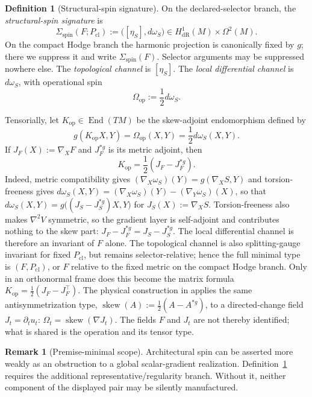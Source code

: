 \documentclass[11pt]{article}
\theoremstyle{definition}
\newtheorem{definition}[theorem]{Definition}
\newtheorem{remark}[theorem]{Remark}
\newcommand{\dR}{\mathrm{dR}}
\newcommand{\Omop}{\Omega_{\mathrm{op}}}
\newcommand{\Sigspin}{\Sigma_{\mathrm{spin}}}
\DeclareMathOperator{\opskew}{skew}
\begin{document}
\begin{definition}[Structural-spin signature]\label{def:signature}
On the declared-selector branch, the \emph{structural-spin signature} is
\[
\Sigspin(F;P_{\mathrm{cl}})
  :=\bigl([\eta_S],d\omega_S\bigr)
  \in H^1_{\dR}(M)\times\Omega^2(M).
\]
On the compact Hodge branch the harmonic projection is canonically fixed by
\(g\); there we suppress it and write \(\Sigspin(F)\).  Selector arguments
may be suppressed nowhere else.  The \emph{topological channel} is
\([\eta_S]\).  The \emph{local differential channel} is \(d\omega_S\),
with operational spin
\[
\Omop:=\frac12d\omega_S.
\]
\end{definition}

Tensorially, let \(K_{\mathrm{op}}\in\operatorname{End}(TM)\) be the
skew-adjoint endomorphism defined by
\[
g(K_{\mathrm{op}}X,Y)=\Omop(X,Y)=\frac12d\omega_S(X,Y).
\]
If \(J_F(X):=\nabla_XF\) and \(J_F^{*g}\) is its metric adjoint, then
\[
K_{\mathrm{op}}=\frac12(J_F-J_F^{*g}).
\]
Indeed, metric compatibility gives \((\nabla_X\omega_S)(Y)=g(\nabla_XS,Y)\)
and torsion-freeness gives
\(d\omega_S(X,Y)=(\nabla_X\omega_S)(Y)-(\nabla_Y\omega_S)(X)\), so that
\(d\omega_S(X,Y)=g\bigl((J_S-J_S^{*g})X,Y\bigr)\) for \(J_S(X):=\nabla_XS\).
Torsion-freeness also makes \(\nabla^2V\) symmetric, so the gradient layer is
self-adjoint and contributes nothing to the skew part:
\(J_F-J_F^{*g}=J_S-J_S^{*g}\).  The local differential channel is therefore
an invariant of \(F\) alone.  The topological channel is also splitting-gauge
invariant for fixed \(P_{\mathrm{cl}}\), but remains selector-relative; hence
the full minimal type is \((F,P_{\mathrm{cl}})\), or \(F\) relative to the
fixed metric on the compact Hodge branch.
Only in an orthonormal frame does this become the matrix formula
\(K_{\mathrm{op}}=\tfrac12(J_F-J_F^\top)\).
The physical construction in \cite{operational} applies the same
antisymmetrization type, \(\opskew(A):=\tfrac12(A-A^{*g})\), to a
directed-change field \(J_t=\partial_tu_t\):
\(\Omega_t=\opskew(\nabla J_t)\).  The fields \(F\) and \(J_t\) are not
thereby identified; what is shared is the operation and its tensor type.

\begin{remark}[Premise-minimal scope]
Architectural spin can be asserted more weakly as an obstruction to a
global scalar-gradient realization.  Definition~\ref{def:signature}
requires the additional representative/regularity branch.  Without it,
neither component of the displayed pair may be silently manufactured.
\end{remark}
\end{document}
